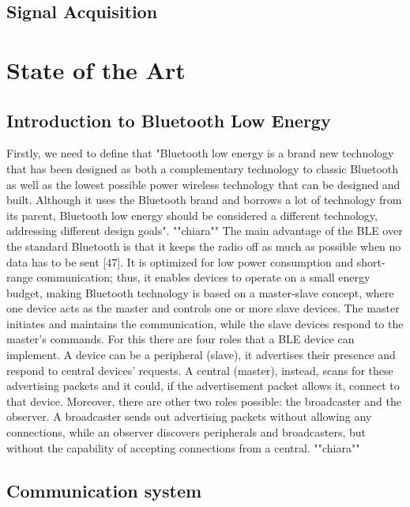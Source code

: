 \documentclass{Configuration_Files/PoliMi3i_thesis}
\begin{document}
\section{Signal Acquisition}



\chapter{State of the Art}



\section{Introduction to Bluetooth Low Energy}

Firstly, we need to define that "Bluetooth low energy is a brand new technology that has been designed as both a complementary
technology to classic Bluetooth as well as the lowest possible power wireless technology that can be
designed and built. Although it uses the Bluetooth brand and borrows a lot of technology from its
parent, Bluetooth low energy should be considered a different technology, addressing different design
goals". \cite{heydonBluetoothLowEnergy2015}
""chiara""
The main advantage of the BLE over the
standard Bluetooth is that it keeps the radio off as much as possible when no data has
to be sent [47]. It is optimized for low power consumption and short-range
communication; thus, it enables devices to operate on a small energy budget, making
Bluetooth technology is based on a master-slave concept, where one device acts as the
master and controls one or more slave devices. The master initiates and maintains the
communication, while the slave devices respond to the master's commands. For this
there are four roles that a BLE device can implement. A device can be a peripheral
(slave), it advertises their presence and respond to central devices' requests. A central
(master), instead, scans for these advertising packets and it could, if the advertisement
packet allows it, connect to that device. Moreover, there are other two roles possible:
the broadcaster and the observer. A broadcaster sends out advertising packets without
allowing any connections, while an observer discovers peripherals and broadcasters,
but without the capability of accepting connections from a central.
""chiara""

\section{Communication system}
\end{document}
